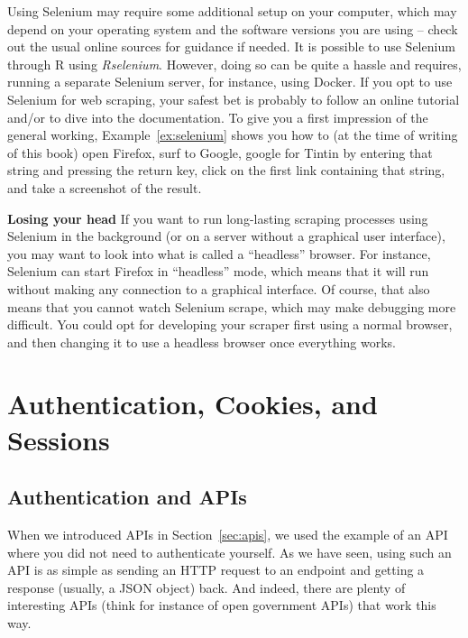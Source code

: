 Using Selenium may require some additional setup on your computer,
which may depend on your operating system and the software versions you
are using -- check out the usual online sources for guidance if
needed.  It is possible to use  Selenium through R using
\emph{Rselenium}. However, doing so can be quite a hassle and requires,
 running a separate Selenium server, for instance,  using
Docker. If you opt to use Selenium for web scraping, your safest bet
is probably to follow an online tutorial and/or to dive into the
documentation. To give you a first impression of the general working,
Example~\ref{ex:selenium} shows you how to (at the time of writing of this
book) open Firefox, surf to Google, google for Tintin by entering that
string and pressing the return key, click on the first link containing
that string, and take a screenshot of the result.



\begin{feature}\textbf{Losing your head}
If you want to run long-lasting scraping processes using Selenium in
the background (or on a server without a graphical user interface),
you may want to look into what is called a ``headless'' browser. For
instance, Selenium can start Firefox in ``headless'' mode, which means
that it will run without making any connection to a graphical
interface. Of course, that also means that you cannot watch Selenium
scrape, which may make debugging more difficult. You could opt for
developing your scraper first using a normal browser, and then
changing it to use a headless browser once everything works.
\end{feature}

%
\section{Authentication, Cookies, and Sessions}
\label{sec:authentication}

\subsection{Authentication and APIs} \label{sec:authapi}

When we introduced APIs in Section~\ref{sec:apis}, we used the example of an
API where you did not need to authenticate yourself. As we have seen,
using such an API is as simple as sending an HTTP request to an
endpoint and getting a response (usually, a JSON object) back. And
indeed, there are plenty of interesting APIs (think for instance of
open government APIs) that work this way.

